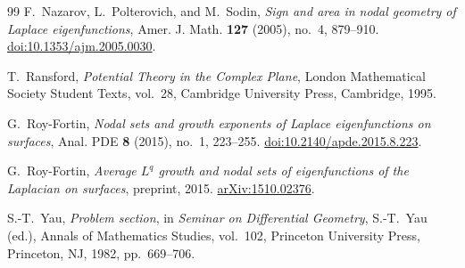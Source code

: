 \begin{thebibliography}{99}
F.~Nazarov, L.~Polterovich, and M.~Sodin,
\emph{Sign and area in nodal geometry of Laplace eigenfunctions},
Amer. J. Math. \textbf{127} (2005), no.~4, 879--910.
\href{https://doi.org/10.1353/ajm.2005.0030}{doi:10.1353/ajm.2005.0030}.

T.~Ransford,
\emph{Potential Theory in the Complex Plane},
London Mathematical Society Student Texts, vol.~28,
Cambridge University Press, Cambridge, 1995.

G.~Roy-Fortin,
\emph{Nodal sets and growth exponents of Laplace eigenfunctions on surfaces},
Anal. PDE \textbf{8} (2015), no.~1, 223--255.
\href{https://doi.org/10.2140/apde.2015.8.223}{doi:10.2140/apde.2015.8.223}.

G.~Roy-Fortin,
\emph{Average $L^q$ growth and nodal sets of eigenfunctions of the Laplacian
on surfaces},
preprint, 2015.
\href{https://arxiv.org/abs/1510.02376}{arXiv:1510.02376}.

S.-T.~Yau,
\emph{Problem section},
in \emph{Seminar on Differential Geometry}, S.-T.~Yau (ed.),
Annals of Mathematics Studies, vol.~102,
Princeton University Press, Princeton, NJ, 1982, pp.~669--706.

\end{thebibliography}

